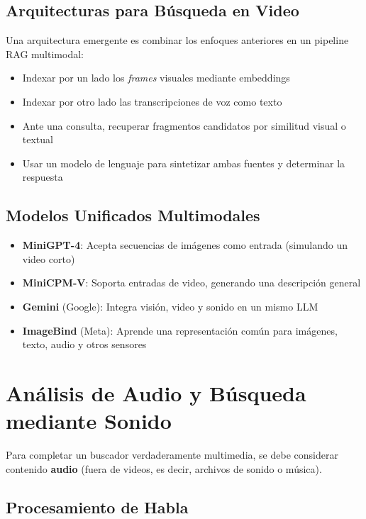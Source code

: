 \subsection{Arquitecturas para Búsqueda en Video}

Una arquitectura emergente es combinar los enfoques anteriores en un pipeline RAG multimodal:
\begin{itemize}
  \item Indexar por un lado los \emph{frames} visuales mediante embeddings
  \item Indexar por otro lado las transcripciones de voz como texto
  \item Ante una consulta, recuperar fragmentos candidatos por similitud visual o textual
  \item Usar un modelo de lenguaje para sintetizar ambas fuentes y determinar la respuesta
\end{itemize}

\subsection{Modelos Unificados Multimodales}

\begin{itemize}
  \item \textbf{MiniGPT-4}: Acepta secuencias de imágenes como entrada (simulando un video corto)
  \item \textbf{MiniCPM-V}: Soporta entradas de video, generando una descripción general
  \item \textbf{Gemini} (Google): Integra visión, video y sonido en un mismo LLM
  \item \textbf{ImageBind} (Meta): Aprende una representación común para imágenes, texto, audio y otros sensores
\end{itemize}

\section{Análisis de Audio y Búsqueda mediante Sonido}

Para completar un buscador verdaderamente multimedia, se debe considerar contenido \textbf{audio} (fuera de videos, es decir, archivos de sonido o música).

\subsection{Procesamiento de Habla}

